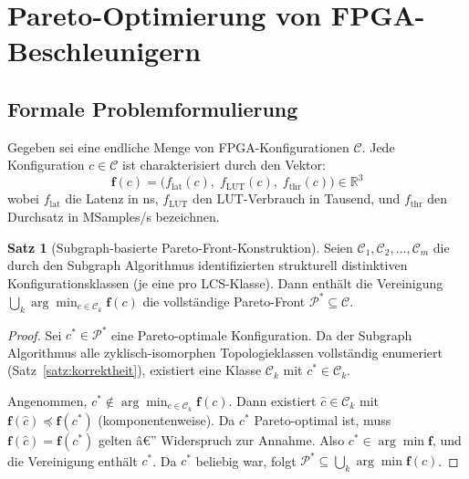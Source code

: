 ﻿\documentclass[a4paper,12pt]{article}
\theoremstyle{definition}
\newtheorem{satz}{Satz}
\begin{document}
\section{Pareto-Optimierung von FPGA-Beschleunigern}
\label{sec:pareto}

\subsection{Formale Problemformulierung}

Gegeben sei eine endliche Menge von FPGA-Konfigurationen $\mathcal{C}$. Jede Konfiguration
$c \in \mathcal{C}$ ist charakterisiert durch den Vektor:
\[
    \mathbf{f}(c) = \bigl(f_{\text{lat}}(c),\; f_{\text{LUT}}(c),\; f_{\text{thr}}(c)\bigr) \in \mathbb{R}^3
\]
wobei $f_{\text{lat}}$ die Latenz in ns, $f_{\text{LUT}}$ den LUT-Verbrauch in Tausend,
und $f_{\text{thr}}$ den Durchsatz in MSamples/s bezeichnen.

\begin{satz}[Subgraph-basierte Pareto-Front-Konstruktion]
\label{satz:pareto}
    Seien $\mathcal{C}_1, \mathcal{C}_2, \ldots, \mathcal{C}_m$ die durch den Subgraph Algorithmus
    identifizierten strukturell distinktiven Konfigurationsklassen (je eine pro LCS-Klasse).
    Dann enthält die Vereinigung $\bigcup_k \arg\min_{c \in \mathcal{C}_k} \mathbf{f}(c)$
    die vollständige Pareto-Front $\mathcal{P}^* \subseteq \mathcal{C}$.
\end{satz}

\begin{proof}
    Sei $c^* \in \mathcal{P}^*$ eine Pareto-optimale Konfiguration. Da der Subgraph Algorithmus
    alle zyklisch-isomorphen Topologieklassen vollständig enumeriert (Satz~\ref{satz:korrektheit}),
    existiert eine Klasse $\mathcal{C}_k$ mit $c^* \in \mathcal{C}_k$.
    
    Angenommen, $c^* \notin \arg\min_{c \in \mathcal{C}_k} \mathbf{f}(c)$.
    Dann existiert $\hat{c} \in \mathcal{C}_k$ mit $\mathbf{f}(\hat{c}) \preceq \mathbf{f}(c^*)$
    (komponentenweise). Da $c^*$ Pareto-optimal ist, muss $\mathbf{f}(\hat{c}) = \mathbf{f}(c^*)$
    gelten â€” Widerspruch zur Annahme. Also $c^* \in \arg\min \mathbf{f}$, und die Vereinigung
    enthält $c^*$. Da $c^*$ beliebig war, folgt $\mathcal{P}^* \subseteq \bigcup_k \arg\min \mathbf{f}(c)$.
\end{proof}
\end{document}
